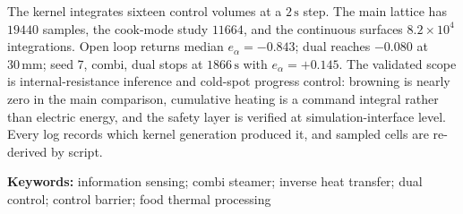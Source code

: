The kernel integrates sixteen control volumes at a $2\,\mathrm{s}$ step. The main lattice has $19440$ samples, the cook-mode study $11664$, and the continuous surfaces $8.2\times 10^{4}$ integrations. Open loop returns median $e_{\alpha}=-0.843$; dual reaches $-0.080$ at $30\,\mathrm{mm}$; seed 7, combi, dual stops at $1866\,\mathrm{s}$ with $e_{\alpha}=+0.145$. The validated scope is internal-resistance inference and cold-spot progress control: browning is nearly zero in the main comparison, cumulative heating is a command integral rather than electric energy, and the safety layer is verified at simulation-interface level. Every log records which kernel generation produced it, and sampled cells are re-derived by script.

\noindent\textbf{Keywords:} information sensing; combi steamer; inverse heat transfer; dual control; control barrier; food thermal processing

{\fangsong\let\bfseries\mdseries\tableofcontents}
\clearpage
\twocolumn








\clearpage
\onecolumn



\clearpage
\twocolumn

\appendix






\BodyBgfalse
\pagestyle{empty}


